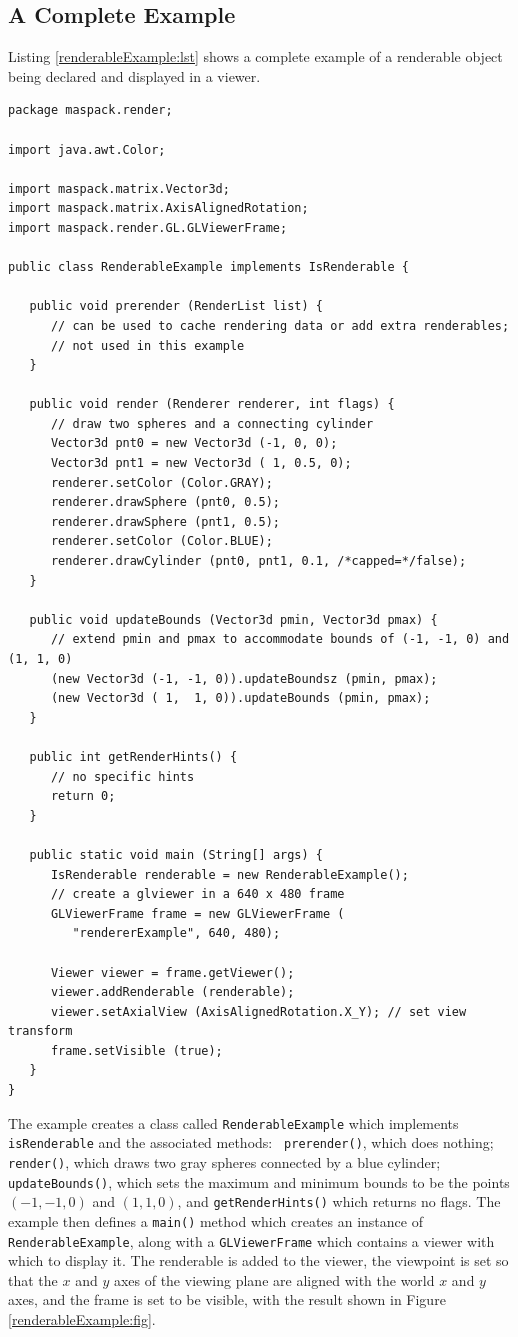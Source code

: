 \subsection{A Complete Example}

Listing \ref{renderableExample:lst} shows a complete example
of a renderable object being declared and displayed in a viewer.
%
\begin{lstlisting}[caption={Declaration and display of a renderable
object.},
label=renderableExample:lst]
package maspack.render;

import java.awt.Color;

import maspack.matrix.Vector3d;
import maspack.matrix.AxisAlignedRotation;
import maspack.render.GL.GLViewerFrame;

public class RenderableExample implements IsRenderable {

   public void prerender (RenderList list) {
      // can be used to cache rendering data or add extra renderables;
      // not used in this example
   }

   public void render (Renderer renderer, int flags) {
      // draw two spheres and a connecting cylinder
      Vector3d pnt0 = new Vector3d (-1, 0, 0);
      Vector3d pnt1 = new Vector3d ( 1, 0.5, 0);
      renderer.setColor (Color.GRAY);
      renderer.drawSphere (pnt0, 0.5);
      renderer.drawSphere (pnt1, 0.5);
      renderer.setColor (Color.BLUE);
      renderer.drawCylinder (pnt0, pnt1, 0.1, /*capped=*/false);
   }

   public void updateBounds (Vector3d pmin, Vector3d pmax) {
      // extend pmin and pmax to accommodate bounds of (-1, -1, 0) and (1, 1, 0)
      (new Vector3d (-1, -1, 0)).updateBoundsz (pmin, pmax);
      (new Vector3d ( 1,  1, 0)).updateBounds (pmin, pmax);
   }

   public int getRenderHints() {
      // no specific hints
      return 0; 
   }

   public static void main (String[] args) {
      IsRenderable renderable = new RenderableExample();
      // create a glviewer in a 640 x 480 frame      
      GLViewerFrame frame = new GLViewerFrame (
         "rendererExample", 640, 480);

      Viewer viewer = frame.getViewer();
      viewer.addRenderable (renderable);
      viewer.setAxialView (AxisAlignedRotation.X_Y); // set view transform
      frame.setVisible (true);
   }
}
\end{lstlisting}
The example creates a class called {\tt RenderableExample} which
implements {\tt isRenderable} and the associated methods: {\tt
prerender()}, which does nothing; {\tt render()}, which draws two gray
spheres connected by a blue cylinder; {\tt updateBounds()}, which sets
the maximum and minimum bounds to be the points $(-1, -1, 0)$ and $(1,
1, 0)$, and {\tt getRenderHints()} which returns no flags. The example
then defines a {\tt main()} method which creates an instance of {\tt
RenderableExample}, along with a {\tt GLViewerFrame} which contains a
viewer with which to display it. The renderable is added to the
viewer, the viewpoint is set so that the $x$ and $y$ axes of the
viewing plane are aligned with the world $x$ and $y$ axes, and the
frame is set to be visible, with the result shown in Figure
\ref{renderableExample:fig}.

